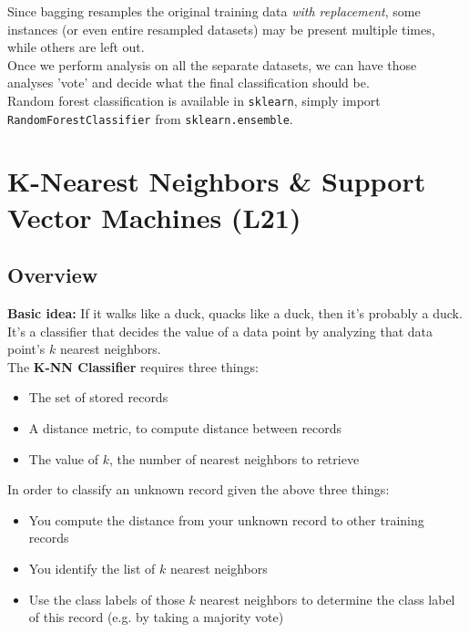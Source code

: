 \documentclass[english, 10pt]{article}
\begin{document}
\hfill \break Since bagging resamples the original training data \textit{with replacement}, some instances (or even entire resampled datasets) may be present multiple times, while others are left out.\\

Once we perform analysis on all the separate datasets, we can have those analyses 'vote' and decide what the final classification should be.\\

Random forest classification is available in \texttt{sklearn}, simply import \texttt{RandomForestClassifier} from \texttt{sklearn.ensemble}.

\section{K-Nearest Neighbors \& Support Vector Machines (L21)}

\subsection{Overview}

\textbf{Basic idea:} If it walks like a duck, quacks like a duck, then it's probably a duck.\\

It's a classifier that decides the value of a data point by analyzing that data point's $k$ nearest neighbors.\\

The \textbf{K-NN Classifier} requires three things:
\begin{itemize}
	\item The set of stored records
	\item A distance metric, to compute distance between records
	\item The value of $k$, the number of nearest neighbors to retrieve
\end{itemize}

In order to classify an unknown record given the above three things:

\begin{itemize}
	\item You compute the distance from your unknown record to other training records
	\item You identify the list of $k$ nearest neighbors
	\item Use the class labels of those $k$ nearest neighbors to determine the class label of this record (e.g. by taking a majority vote)
\end{itemize}
\end{document}
